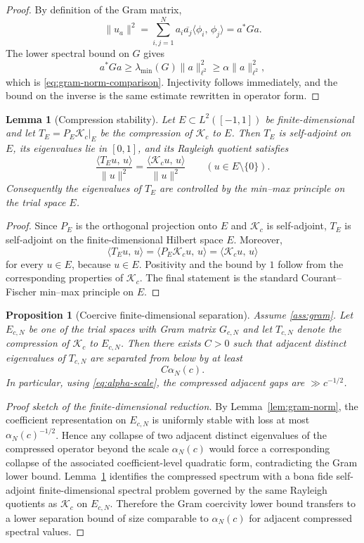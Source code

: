 \documentclass[12pt,a4paper]{amsart}
\newtheorem{lemma}[theorem]{Lemma}
\newtheorem{proposition}[theorem]{Proposition}
\theoremstyle{definition}
\theoremstyle{remark}
\newcommand{\ip}[2]{\langle #1,\, #2\rangle}
\newcommand{\Kc}{\mathcal{K}_c}
\begin{document}
\begin{proof}
By definition of the Gram matrix,
\[
  \|u_a\|^2 = \sum_{i,j=1}^N a_i\overline{a_j}\ip{\phi_i}{\phi_j}
  = a^* G a.
\]
The lower spectral bound on $G$ gives
\[
  a^*Ga \ge \lambda_{\min}(G)\|a\|_{\ell^2}^2 \ge \alpha\|a\|_{\ell^2}^2,
\]
which is \eqref{eq:gram-norm-comparison}.
Injectivity follows immediately, and the bound on the inverse is the same
estimate rewritten in operator form.
\end{proof}

\begin{lemma}[Compression stability]
\label{lem:compression}
Let $E\subset L^2([-1,1])$ be finite-dimensional and let
$T_E=P_E\Kc|_E$ be the compression of $\Kc$ to $E$.
Then $T_E$ is self-adjoint on $E$, its eigenvalues lie in $[0,1]$, and its
Rayleigh quotient satisfies
\[
  \frac{\ip{T_Eu}{u}}{\|u\|^2} = \frac{\ip{\Kc u}{u}}{\|u\|^2}
  \qquad (u\in E\setminus\{0\}).
\]
Consequently the eigenvalues of $T_E$ are controlled by the min--max
principle on the trial space $E$.
\end{lemma}

\begin{proof}
Since $P_E$ is the orthogonal projection onto $E$ and $\Kc$ is self-adjoint,
$T_E$ is self-adjoint on the finite-dimensional Hilbert space $E$.
Moreover,
\[
  \ip{T_Eu}{u} = \ip{P_E\Kc u}{u} = \ip{\Kc u}{u}
\]
for every $u\in E$, because $u\in E$.
Positivity and the bound by $1$ follow from the corresponding properties of
$\Kc$.
The final statement is the standard Courant--Fischer min--max principle on
$E$.
\end{proof}

\begin{proposition}[Coercive finite-dimensional separation]
\label{prop:coercive-separation}
Assume \ref{ass:gram}.
Let $E_{c,N}$ be one of the trial spaces with Gram matrix $G_{c,N}$ and let
$T_{c,N}$ denote the compression of $\Kc$ to $E_{c,N}$.
Then there exists $C>0$ such that adjacent distinct eigenvalues of $T_{c,N}$
are separated from below by at least
\begin{equation}\label{eq:compressed-gap}
  C\alpha_N(c).
\end{equation}
In particular, using \eqref{eq:alpha-scale}, the compressed adjacent gaps are
$\gg c^{-1/2}$.
\end{proposition}

\begin{proof}[Proof sketch of the finite-dimensional reduction]
By Lemma~\ref{lem:gram-norm}, the coefficient representation on $E_{c,N}$ is
uniformly stable with loss at most $\alpha_N(c)^{-1/2}$.
Hence any collapse of two adjacent distinct eigenvalues of the compressed
operator beyond the scale $\alpha_N(c)$ would force a corresponding collapse
of the associated coefficient-level quadratic form, contradicting the Gram
lower bound.
Lemma~\ref{lem:compression} identifies the compressed spectrum with a bona
fide self-adjoint finite-dimensional spectral problem governed by the same
Rayleigh quotients as $\Kc$ on $E_{c,N}$.
Therefore the Gram coercivity lower bound transfers to a lower separation
bound of size comparable to $\alpha_N(c)$ for adjacent compressed spectral
values.
\end{proof}
\end{document}
